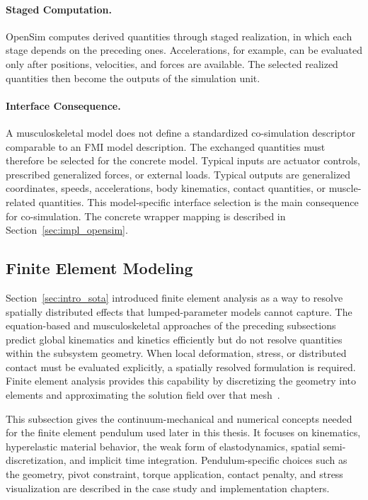 \paragraph{Staged Computation.}
OpenSim computes derived quantities through staged realization, in which each stage depends on the preceding ones.
Accelerations, for example, can be evaluated only after positions, velocities, and forces are available.
The selected realized quantities then become the outputs of the simulation unit.

\paragraph{Interface Consequence.}
A musculoskeletal model does not define a standardized co-simulation descriptor comparable to an \ac{FMI} model description.
The exchanged quantities must therefore be selected for the concrete model.
Typical inputs are actuator controls, prescribed generalized forces, or external loads.
Typical outputs are generalized coordinates, speeds, accelerations, body kinematics, contact quantities, or muscle-related quantities.
This model-specific interface selection is the main consequence for co-simulation.
The concrete wrapper mapping is described in Section~\ref{sec:impl_opensim}.

\subsection{Finite Element Modeling}
\label{sec:243_modeling_fem}

Section~\ref{sec:intro_sota} introduced finite element analysis as a way to resolve spatially distributed effects that lumped-parameter models cannot capture.
The equation-based and musculoskeletal approaches of the preceding subsections predict global kinematics and kinetics efficiently but do not resolve quantities within the subsystem geometry.
When local deformation, stress, or distributed contact must be evaluated explicitly, a spatially resolved formulation is required.
Finite element analysis provides this capability by discretizing the geometry into elements and approximating the solution field over that mesh~\cite{knothe_finite_2017}.

This subsection gives the continuum-mechanical and numerical concepts needed for the finite element pendulum used later in this thesis.
It focuses on kinematics, hyperelastic material behavior, the weak form of elastodynamics, spatial semi-discretization, and implicit time integration.
Pendulum-specific choices such as the geometry, pivot constraint, torque application, contact penalty, and stress visualization are described in the case study and implementation chapters.

